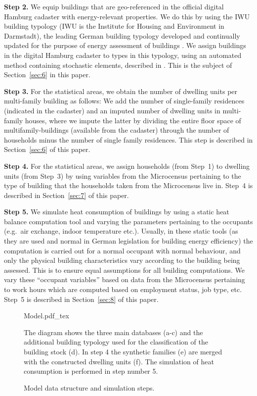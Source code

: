 \documentclass[11pt]{IJM-article}
\begin{document}
\textbf{Step 2.} We equip buildings that are geo-referenced in the official
digital Hamburg cadaster with energy-relevant properties. We do this by using
the IWU building typology (IWU is the Institute for Housing and Environment in
Darmstadt), the leading German building typology developed and continually
updated for the purpose of energy assessment of buildings . We
assign buildings in the digital Hamburg cadaster to types in this typology,
using an automated method containing stochastic elements, described in
. This is the subject of Section~\ref{sec:6} in this
paper.

\textbf{Step 3.} For the statistical areas, we obtain the number of dwelling
units per multi-family building as follows: We add the number of single-family
residences (indicated in the cadaster) and an imputed number of dwelling units
in multi-family houses, where we impute the latter by dividing the entire floor
space of multifamily-buildings (available from the cadaster) through the number
of households minus the number of single family residences. This step is
described in Section~\ref{sec:6} of this paper.

\textbf{Step 4.} For the statistical areas, we assign households (from Step~1)
to dwelling units (from Step~3) by using variables from the Microcensus
pertaining to the type of building that the households taken from the
Microcensus live in. Step~4 is described in Section~\ref{sec:7} of this
paper.

\textbf{Step 5.} We simulate heat consumption of buildings by using a static
heat balance computation tool and varying the parameters pertaining to the
occupants (e.g.\ air exchange, indoor temperature etc.). Usually, in these
static tools (as they are used and normal in German legislation for building
energy efficiency) the computation is carried out for a normal occupant with
normal behaviour, and only the physical building characteristics vary according
to the building being assessed. This is to ensure equal assumptions for all
building computations. We vary these ``occupant variables'' based on data from
the Microcensus pertaining to work hours which are computed based on employment
status, job type, etc. Step~5 is described in Section~\ref{sec:8} of this
paper.

\begin{figure}[htb] 
    \centering
    \caption{Model data structure and simulation steps.}\label{fig:1}
	\def\svgwidth{0.77\linewidth}
    {Model.pdf_tex}\\
    \begin{flushleft}
    \begin{footnotesize}
    The diagram shows the three main databases (a-c) and the additional
building typology used for the classification of the building stock (d). In
step 4 the synthetic families (e) are merged with the constructed dwelling
units (f). The simulation of heat consumption is performed in step number 5.
    \end{footnotesize}
    \end{flushleft}
\end{figure}
\end{document}

